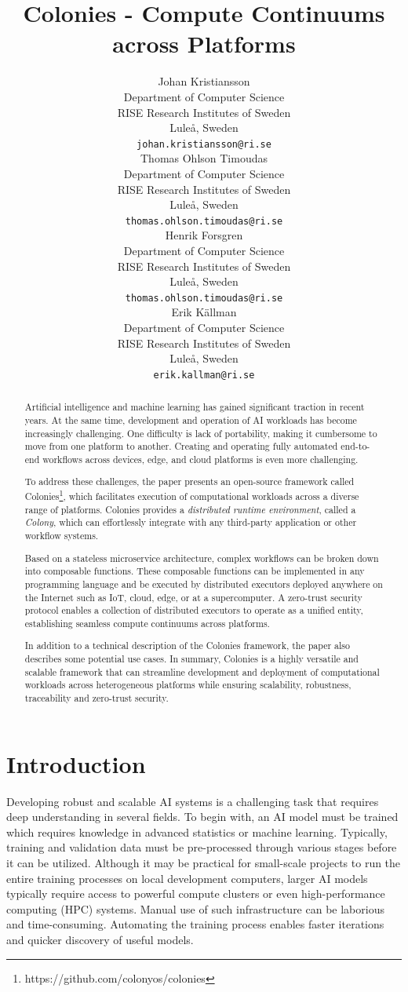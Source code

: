 \documentclass{article}
\title{Colonies - Compute Continuums across Platforms}
\author{{\hspace{1mm}Johan Kristiansson} \\
	Department of Computer Science \\
	RISE Research Institutes of Sweden \\
	Luleå, Sweden \\
	\texttt{johan.kristiansson@ri.se} \\
	\And
	{\hspace{1mm}Thomas Ohlson Timoudas} \\
	Department of Computer Science \\
	RISE Research Institutes of Sweden \\
	Luleå, Sweden \\
	\texttt{thomas.ohlson.timoudas@ri.se} \\
	\And
	{\hspace{1mm}Henrik Forsgren} \\
	Department of Computer Science \\
	RISE Research Institutes of Sweden \\
	Luleå, Sweden \\
	\texttt{thomas.ohlson.timoudas@ri.se} \\
	\And
	{\hspace{1mm}Erik Källman} \\
	Department of Computer Science \\
	RISE Research Institutes of Sweden \\
	Luleå, Sweden \\
	\texttt{erik.kallman@ri.se} \\
}
\begin{document}
\maketitle

\begin{abstract}
Artificial intelligence and machine learning has gained significant traction in recent years. At the same time, development and operation of AI workloads has become increasingly challenging. One difficulty is lack of portability, making it cumbersome to move from one platform to another. Creating and operating fully automated end-to-end workflows across devices, edge, and cloud platforms is even more challenging. 

To address these challenges, the paper presents an open-source framework called Colonies\footnote{https://github.com/colonyos/colonies}, which facilitates execution of computational workloads across a diverse range of platforms. Colonies provides a \emph{distributed runtime environment}, called a \emph{Colony}, which can effortlessly integrate with any third-party application or other workflow systems.

Based on a stateless microservice architecture, complex workflows can be broken down into composable functions. These composable functions can be implemented in any programming language and be executed by distributed executors deployed anywhere on the Internet such as IoT, cloud, edge, or at a supercomputer. A zero-trust security protocol enables a collection of distributed executors to operate as a unified entity, establishing seamless compute continuums across platforms.

In addition to a technical description of the Colonies framework, the paper also describes some potential use cases. In summary, Colonies is a highly versatile and scalable framework that can streamline development and deployment of computational workloads across heterogeneous platforms while ensuring scalability, robustness, traceability and zero-trust security.
\end{abstract}


\section{Introduction}
Developing robust and scalable AI systems is a challenging task that requires deep understanding in several fields. To begin with, an AI model must be trained which requires knowledge in advanced statistics or machine learning. Typically, training and validation data must be pre-processed through various stages before it can be utilized. Although it may be practical for small-scale projects to run the entire training processes on local development computers, larger AI models typically require access to powerful compute clusters or even high-performance computing (HPC) systems. Manual use of such infrastructure can be laborious and time-consuming. Automating the training process enables faster iterations and quicker discovery of useful models.
\end{document}
